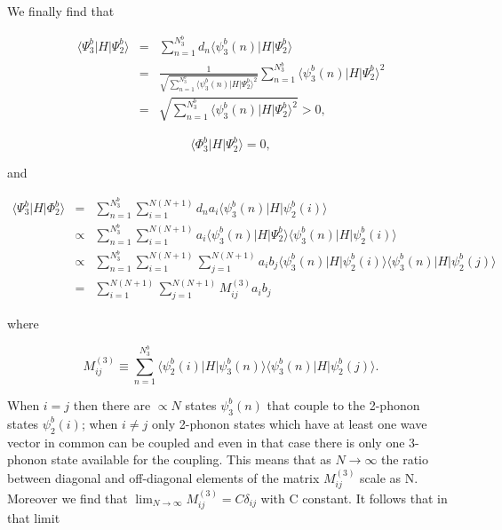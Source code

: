 \documentclass[pt12]{article}
\begin{document}
We finally find that

\begin{eqnarray}
\langle \Psi^b_3 | H | \Psi^b_2 \rangle &=& \sum_{n=1}^{N^b_3} d_n
\langle \psi^b_3(n) | H | \Psi^b_2 \rangle \\ \nonumber &=&
\frac{1}{\sqrt{\sum_{n=1}^{N^b_3}  \langle \psi^b_3(n) | H |
\Psi^b_2 \rangle^2}} \sum_{n=1}^{N^b_3} \langle \psi^b_3(n) | H |
\Psi^b_2 \rangle^2
\\ \nonumber
&=& \sqrt{\sum_{n=1}^{N^b_3}  \langle \psi^b_3(n) | H | \Psi^b_2
\rangle^2} > 0,
\end{eqnarray}

\begin{equation}
\langle \Phi^b_3 |H| \Psi^b_2 \rangle = 0,
\end{equation}

and

\begin{eqnarray}\label{Psib2_Phib1}
\langle \Psi^b_3 |H| \Phi^b_2 \rangle &=& \sum_{n=1}^{N^b_3}
\sum_{i=1}^{N(N+1)} d_n a_i \langle \psi^b_3(n) | H | \psi^b_2(i)
\rangle
\\ \nonumber &\propto& \sum_{n=1}^{N^b_3}
 \sum_{i=1}^{N(N+1)} a_i \langle \psi^b_3(n) | H
| \Psi^b_2 \rangle \langle \psi^b_3(n) | H | \psi^b_2(i) \rangle
\\ \nonumber &\propto&  \sum_{n=1}^{N^b_3}
 \sum_{i=1}^{N(N+1)} \sum_{j=1}^{N(N+1)} a_i b_j \langle \psi^b_3(n) | H | \psi^b_2(i) \rangle
\langle \psi^b_3(n) | H | \psi^b_2(j) \rangle
\\ \nonumber &=&
 \sum_{i=1}^{N(N+1)} \sum_{j=1}^{N(N+1)} M^{(3)}_{ij} a_i b_j
\end{eqnarray}

where

\begin{equation}\label{AB_relation}
M^{(3)}_{ij} \equiv \sum_{n=1}^{N^b_3}
 \langle \psi^b_2(i) | H | \psi^b_3(n)  \rangle
\langle \psi^b_3(n) | H | \psi^b_2(j) \rangle.
\end{equation}

When $i=j$ then there are $\propto N$ states $\psi^b_3(n)$ that
couple to the 2-phonon states $\psi^b_2(i)$; when $i\neq j$ only
2-phonon states which have at least one wave vector in common can be
coupled and even in that case there is only one 3-phonon state
available for the coupling. This means that as $N\rightarrow\infty$
the ratio between diagonal and off-diagonal elements of the matrix
$M^{(3)}_{ij}$ scale as N. Moreover we find that
$\lim_{N\rightarrow\infty} M^{(3)}_{ij}=C\delta_{ij}$ with C
constant. It follows that in that limit
\end{document}
